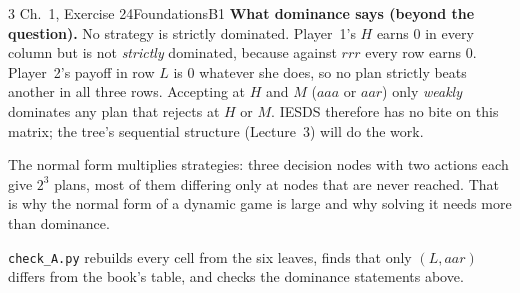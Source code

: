 \begin{exsol}{3}{\MG{} Ch.~1, Exercise 2}{4}{Foundations}{B1}
\textbf{What dominance says (beyond the question).} No strategy is strictly dominated. Player~1's
$H$ earns $0$ in every column but is not \emph{strictly} dominated, because against $rrr$ every
row earns $0$. Player~2's payoff in row $L$ is $0$ whatever she does, so no plan strictly beats
another in all three rows. Accepting at $H$ and $M$ ($aaa$ or $aar$) only \emph{weakly}
dominates any plan that rejects at $H$ or $M$. IESDS therefore has no bite on this matrix; the
tree's sequential structure (Lecture~3) will do the work.

\interp The normal form multiplies strategies: three decision nodes with two actions each
give $2^3$ plans, most of them differing only at nodes that are never reached. That is why the
normal form of a dynamic game is large and why solving it needs more than dominance.

\verify \texttt{check\_A.py} rebuilds every cell from the six leaves, finds that only
$(L, aar)$ differs from the book's table, and checks the dominance statements above.

\end{exsol}
